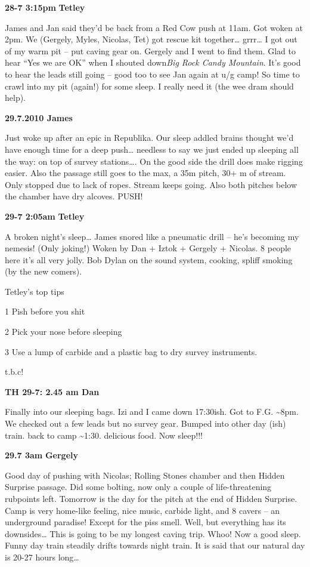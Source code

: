\textbf{28-7 3:15pm} \textbf{Tetley}

James and Jan said they'd be back from a Red Cow push at 11am. Got woken
at 2pm. We (Gergely, Myles, Nicolas, Tet) got rescue kit
together\ldots{} grrr\ldots{} I got out of my warm pit -- put caving
gear on. Gergely and I went to find them. Glad to hear ``Yes we are OK''
when I shouted down\emph{Big Rock Candy Mountain}. It's good to hear the
leads still going -- good too to see Jan again at u/g camp! So time to
crawl into my pit (again!) for some sleep. I really need it (the wee
dram should help).

\textbf{29.7.2010 James}

Just woke up after an epic in Republika. Our sleep addled brains thought
we'd have enough time for a deep push\ldots{} needless to say we just
ended up sleeping all the way: on top of survey stations\ldots{}. On the
good side the drill does make rigging easier. Also the passage still
goes to the max, a 35m pitch, 30+ m of stream. Only stopped due to lack
of ropes. Stream keeps going. Also both pitches below the chamber have
dry alcoves. PUSH!

\textbf{29-7 2:05am} \textbf{Tetley}

A broken night's sleep\ldots{} James snored like a pneumatic drill --
he's becoming my nemesis! (Only joking!) Woken by Dan + Iztok + Gergely
+ Nicolas. 8 people here it's all very jolly. Bob Dylan on the sound
system, cooking, spliff smoking (by the new comers).

Tetley's top tips

1 Pish before you shit

2 Pick your nose before sleeping

3 Use a lump of carbide and a plastic bag to dry survey instruments.

t.b.c!

\textbf{TH 29-7: 2.45 am Dan}

Finally into our sleeping bags. Izi and I came down 17:30ish. Got to
F.G. \textasciitilde{}8pm. We checked out a few leads but no survey
gear. Bumped into other day (ish) train. back to camp
\textasciitilde{}1:30. delicious food. Now sleep!!!

\textbf{29.7 3am} \textbf{Gergely}

Good day of pushing with Nicolas; Rolling Stones chamber and then Hidden
Surprise passage. Did some bolting, now only a couple of
life-threatening rubpoints left. Tomorrow is the day for the pitch at
the end of Hidden Surprise. Camp is very home-like feeling, nice music,
carbide light, and 8 cavers -- an underground paradise! Except for the
piss smell. Well, but everything has its downsides\ldots{} This is going
to be my longest caving trip. Whoo! Now a good sleep. Funny day train
steadily drifts towards night train. It is said that our natural day is
20-27 hours long\ldots{}

